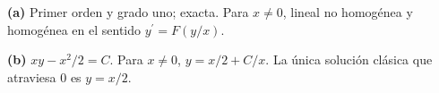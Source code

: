 \noindent\textbf{(a)} Primer orden y grado uno; exacta. Para $x\ne0$, lineal no homogénea y homogénea en el sentido $y^{\prime}=F(y/x)$.

\noindent\textbf{(b)} $xy-x^2/2=C$. Para $x\ne0$, $y=x/2+C/x$. La única solución clásica que atraviesa $0$ es $y=x/2$.
